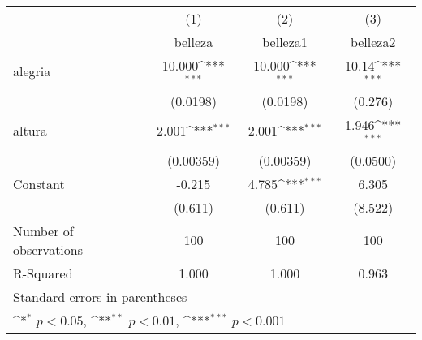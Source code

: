 {
\def\sym#1{\ifmmode^{#1}\else\(^{#1}\)\fi}
\begin{tabular}{l*{3}{c}}
\hline\hline
                    &\multicolumn{1}{c}{(1)}&\multicolumn{1}{c}{(2)}&\multicolumn{1}{c}{(3)}\\
                    &\multicolumn{1}{c}{belleza}&\multicolumn{1}{c}{belleza1}&\multicolumn{1}{c}{belleza2}\\
\hline
alegria             &      10.000\sym{***}&      10.000\sym{***}&       10.14\sym{***}\\
                    &    (0.0198)         &    (0.0198)         &     (0.276)         \\
[1em]
altura              &       2.001\sym{***}&       2.001\sym{***}&       1.946\sym{***}\\
                    &   (0.00359)         &   (0.00359)         &    (0.0500)         \\
[1em]
Constant            &      -0.215         &       4.785\sym{***}&       6.305         \\
                    &     (0.611)         &     (0.611)         &     (8.522)         \\
\hline
Number of observations&         100         &         100         &         100         \\
R-Squared           &       1.000         &       1.000         &       0.963         \\
\hline\hline
\multicolumn{4}{l}{\footnotesize Standard errors in parentheses}\\
\multicolumn{4}{l}{\footnotesize \sym{*} \(p<0.05\), \sym{**} \(p<0.01\), \sym{***} \(p<0.001\)}\\
\end{tabular}
}

